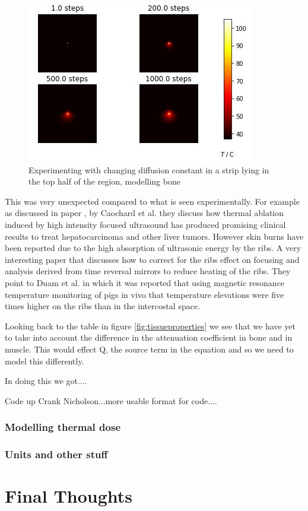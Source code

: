 \documentclass[11pt]{article} %
\begin{document}
\begin{figure}
	\centering
	\includegraphics[width=0.8\linewidth]{"Report_images/change diffusion constant"}
	\caption{Experimenting with changing diffusion constant in a strip lying in the top half of the region, modelling bone}
	\label{fig:change-diffusion-constant}
\end{figure}

This was very unexpected compared to what is seen  experimentally. For example as discussed in paper \cite{Cochard2009}, by Caochard et al. they discuss how thermal ablation induced by high intensity focused ultrasound has produced promising clinical results to treat hepatocarcinoma and other liver tumors. However skin burns have been reported due to the high absorption of ultrasonic energy by the ribs. A very interesting paper that discusses how to correct for the ribs effect on focusing and analysis derived from time reversal mirrors to reduce heating of the ribs. They point to Duam et al. \cite{Daum1999}  in which it was reported that using magnetic resonance temperature monitoring of pigs in vivo that  temperature elevations were five times higher on the ribs than in the intercostal space. 

Looking back to the table in figure \ref{fig:tissueproperties} we see that we have yet to take into account the difference in the attenuation coefficient in bone and in muscle. This would effect Q, the source term in the equation and so we need to model this differently. 

  



In doing this we got....


Code up Crank Nicholson...more usable format for code....


\subsubsection{Modelling thermal dose}
\subsubsection{Units and other stuff}


  
	\section{Final Thoughts} 

\pagebreak	
	
	
\end{document}
